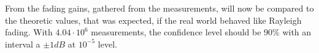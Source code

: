 From the fading gains, gathered from the measurements, will now be compared to the theoretic values, that was expected, if the real world behaved like Rayleigh fading. With $4.04 \cdot 10^6$ measurements, the confidence level should be 90\% with an interval a $\pm 1dB$ at $10^{-5}$ level.